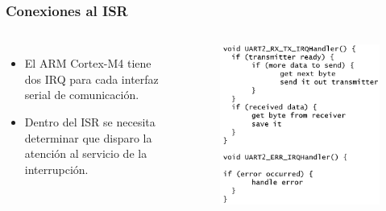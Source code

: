 \documentclass[10.5pt,scale=1.0,t,aspectratio=169,hyperref={pdfpagelabels=false}]{beamer}
\begin{document}
\begin{frame}
	\frametitle{Conexiones al ISR}
	\begin{columns}
		\begin{itemize}
			\item El ARM Cortex-M4 tiene dos IRQ para cada interfaz serial de comunicación. 
			\item Dentro del ISR se necesita determinar que disparo la atención al servicio de la interrupción. 
		\end{itemize}
		
		
		\begin{figure}
			\centering
			\includegraphics[scale=0.35]{09_ISRIRQ}
		\end{figure}
	\end{columns}
\end{frame}
\end{document}
